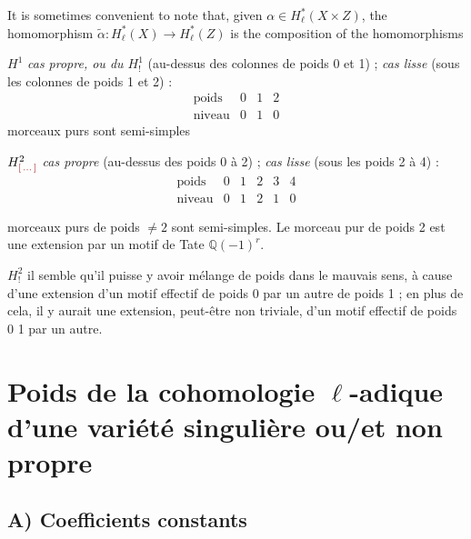 \documentclass[11pt,a4paper]{article}
\begin{document}
It is sometimes convenient to note that, given
$\alpha \in H^{*}_{\ell}(X \times Z)$, the homomorphism
$\tilde{\alpha} : H^{*}_{\ell}(X) \to H^{*}_{\ell}(Z)$ is the composition of
the homomorphisms


$H^{1}$ \quad \struck{\ill{}} \emph{cas propre, ou du $H^{1}_{!}$} (au-dessus
des colonnes de poids 0 et 1) ; \emph{cas lisse} (sous les colonnes de poids 1
et 2) :
\[
\begin{array}{c|ccc}
\text{poids} & 0 & 1 & 2 \\
\hline
\text{niveau} & 0 & 1 & 0
\end{array}
\]
morceaux purs sont semi-simples

$H^{2}_{\ill{}}$ \quad \emph{cas propre} (au-dessus des poids 0 à 2) ;
\emph{cas lisse} (sous les poids 2 à 4) :
\[
\begin{array}{c|ccccc}
\text{poids} & 0 & 1 & 2 & 3 & 4 \\
\hline
\text{niveau} & 0 & 1 & 2 & 1 & 0
\end{array}
\]

morceaux purs de poids $\neq 2$ sont semi-simples. Le morceau pur de poids 2
est une extension par un motif de Tate $\mathbb{Q}(-1)^{r}$.

$H^{2}_{!}$ \quad il semble qu'il puisse y avoir mélange de poids dans le
mauvais sens, à cause d'une extension d'un motif effectif de poids 0 par un
autre de poids 1 ; en plus de cela, il y aurait une extension, peut-être non
triviale, d'un motif effectif de poids 0  1 par un autre.

\section{Poids de la cohomologie $\ell$-adique d'une variété singulière ou/et non propre}

\subsection{A) Coefficients constants}
\end{document}
